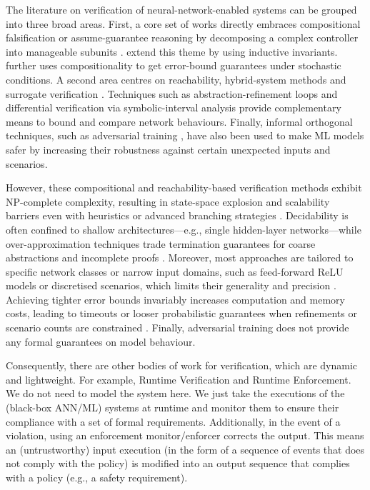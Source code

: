  
The literature on verification of neural-network-enabled systems can be grouped into three broad areas. First, a core set of works directly embraces compositional falsification or assume-guarantee reasoning by decomposing a complex controller into manageable subunits \cite{ivanov_compositional_2021, pasareanu_compositional_2018}. \cite{Zhou2023Compositional} extend this theme by using inductive invariants. \cite{Watson2025Scenario} further uses compositionality to get error-bound guarantees under stochastic conditions. A second area centres on reachability, hybrid-system methods \cite{Ivanov2019Verisig, Kouvaros2021Towards} and surrogate verification \cite{Cai2024Scalable, Wang2022Verified}. Techniques such as abstraction-refinement loops \cite{Elboher2020Abstraction} and differential verification via symbolic-interval analysis \cite{Paulsen2020ReluDiff} provide complementary means to bound and compare network behaviours. Finally, informal orthogonal techniques, such as adversarial training \cite{10.1145/3134599}, have also been used to make ML models safer by increasing their robustness against certain unexpected inputs and scenarios.


However, these compositional and reachability-based verification methods exhibit NP-complete complexity, resulting in state-space explosion and scalability barriers even with heuristics or advanced branching strategies \cite{pasareanu_compositional_2018, Cai2024Scalable, Kouvaros2021Towards}. Decidability is often confined to shallow architectures—e.g., single hidden-layer networks—while over-approximation techniques trade termination guarantees for coarse abstractions and incomplete proofs \cite{Ivanov2019Verisig, Wang2022Verified}. Moreover, most approaches are tailored to specific network classes or narrow input domains, such as feed-forward ReLU models or discretised scenarios, which limits their generality and precision \cite{Paulsen2020ReluDiff, Watson2025Scenario}. Achieving tighter error bounds invariably increases computation and memory costs, leading to timeouts or looser probabilistic guarantees when refinements or scenario counts are constrained \cite{Zhou2023Compositional, Watson2025Scenario}. Finally, adversarial training does not provide any formal guarantees on model behaviour.

Consequently, there are other bodies of work for verification, which are dynamic and lightweight. For example, Runtime Verification and Runtime Enforcement. We do not need to model the system here. We just take the executions of the (black-box ANN/ML) systems at runtime and monitor them to ensure their compliance with a set of formal requirements. Additionally, in the event of a violation, using an enforcement monitor/enforcer corrects the output. This means an (untrustworthy) input execution (in the form of a sequence of events that does not comply with the policy) is modified into an output sequence that complies with a policy (e.g., a safety requirement). 


